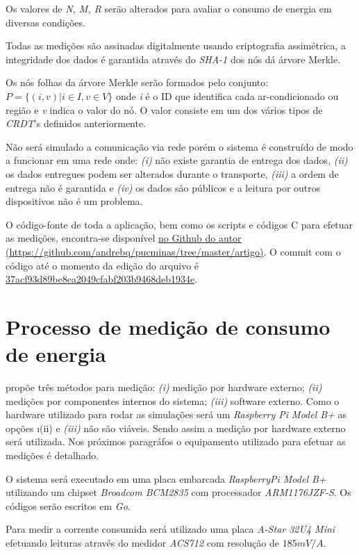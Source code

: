 \documentclass[12pt]{article}
\begin{document}
Os valores de {\it N, M, R} serão alterados para avaliar o consumo de energia em diversas condições.

Todas as medições são assinadas digitalmente usando criptografia assimétrica, a integridade dos dados é garantida através do {\it SHA-1} dos nós dá árvore Merkle.

Os nós folhas da árvore Merkle serão formados pelo conjunto: \ensuremath{P = \{(i, v) | i \in I, v \in V\}} onde {\it i} é o ID que identifica cada ar-condicionado ou região e {\it v} indica o valor do nó. O valor consiste em um dos vários tipos de {\it CRDT}'s definidos anteriormente.

Não será simulado a comunicação via rede porém o sistema é construído de modo a funcionar em uma rede onde: {\it (i)} não existe garantia de entrega dos dados, {\it (ii)} os dados entregues podem ser alterados durante o transporte, {\it (iii)} a ordem de entrega não é garantida e {\it (iv)} os dados são públicos e a leitura por outros dispositivos não é um problema.

O código-fonte de toda a aplicação, bem como os scripts e códigos C para efetuar as medições, encontra-se disponível \href{https://github.com/andrebq/pucminas/tree/master/artigo}{ no Github do autor (https://github.com/andrebq/pucminas/tree/master/artigo)}. O commit com o código até o momento da edição do arquivo é \href{https://github.com/andrebq/pucminas/tree/37acf93d89be8ea2049cfabf203b9468deb1934e}{37acf93d89be8ea2049cfabf203b9468deb1934e}.

\section{Processo de medição de consumo de energia}

\cite{measurement_methods_mobile} propõe três métodos para medição: {\it (i)} medição por hardware externo; {\it (ii)} medições por componentes internos do sistema; {\it (iii)} software externo. Como o hardware utilizado para rodar as simulações será um {\it Raspberry Pi Model B+} as opções {\i (ii)} e {\it (iii)} não são viáveis. Sendo assim a medição por hardware externo será utilizada. Nos próximos paragráfos o equipamento utilizado para efetuar as medições é detalhado.

O sistema será executado em uma placa embarcada {\it RaspberryPi Model B+} utilizando um chipset {\it Broadcom BCM2835} com processador {\it ARM1176JZF-S}. Os códigos serão escritos em {\it Go}.

Para medir a corrente consumida será utilizado uma placa {\it A-Star 32U4 Mini} efetuando leituras através do medidor {\it ACS712} \cite{acs712ds} com resolução de \ensuremath{185mV/A}.
\end{document}
